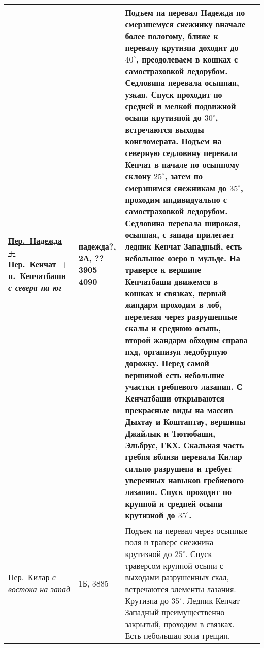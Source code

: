 \begin{longtable}{|>{\centering\arraybackslash}m{4.5cm}|>{\centering\arraybackslash}m{1.8cm}|>{\raggedright\arraybackslash}m{9.6cm}|>{\centering\arraybackslash}m{1.2cm}|}
			\hyperref[subsec:Day16]{{\small Пер.~Надежда + Пер.~Кенчат~+ п.~Кенчатбаши}}									\newline\textit{с севера на юг}			&	надежда?, 2А, ?? 3905 4090	&	{\small Подъем на перевал Надежда по смерзшемуся снежнику вначале более пологому, ближе к перевалу крутизна доходит до $40^\circ$, преодолеваем в кошках с самостраховкой ледорубом. Седловина перевала осыпная, узкая. Спуск проходит по средней и мелкой подвижной осыпи крутизной до $30^\circ$, встречаются выходы конгломерата. Подъем на северную седловину перевала Кенчат в начале по осыпному склону $25^\circ$, затем по смерзшимся снежникам до $35^\circ$, проходим индивидуально с самостраховкой ледорубом. Седловина перевала широкая, осыпная, с запада прилегает ледник Кенчат Западный, есть небольшое озеро в мульде. На траверсе к вершине Кенчатбаши движемся в кошках и связках, первый жандарм проходим в лоб, перелезая через разрушенные скалы и среднюю осыпь, второй жандарм обходим справа пхд, организуя ледобурную дорожку. Перед самой вершиной есть небольшие участки гребневого лазания. С Кенчатбаши открываются прекрасные виды на массив Дыхтау и Коштантау, вершины Джайлык и Тютюбаши, Эльбрус, ГКХ. Скальная часть гребня вблизи перевала Килар сильно разрушена и требует уверенных навыков гребневого лазания. Спуск проходит по крупной и средней осыпи крутизной до $35^\circ$.}																																										&			\\ \hline
			\hyperref[subsec:Day16]{{\small Пер.~Килар}}																	\newline\textit{с востока на запад}		&	1Б, 3885					&	{\small Подъем на перевал через осыпные поля и траверс снежника крутизной до $25^\circ$. Спуск траверсом крупной осыпи с выходами разрушенных скал, встречаются элементы лазания. Крутизна до $35^\circ$. Ледник Кенчат Западный преимущественно закрытый, проходим в связках. Есть небольшая зона трещин.}																																																																																																																																																																																																																																																																						&			\\ \hline

\end{longtable}
